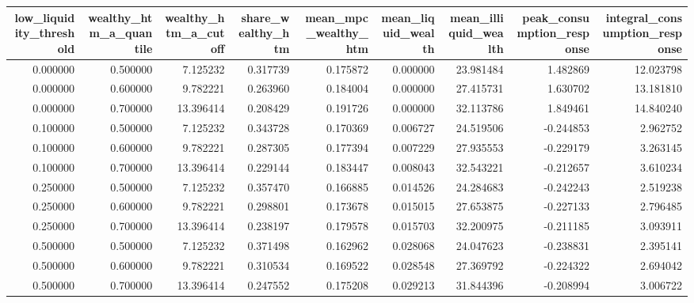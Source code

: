 \begin{tabular}{rrrrrrrrr}
\toprule
low_liquidity_threshold & wealthy_htm_a_quantile & wealthy_htm_a_cutoff & share_wealthy_htm & mean_mpc_wealthy_htm & mean_liquid_wealth & mean_illiquid_wealth & peak_consumption_response & integral_consumption_response \\
\midrule
0.000000 & 0.500000 & 7.125232 & 0.317739 & 0.175872 & 0.000000 & 23.981484 & 1.482869 & 12.023798 \\
0.000000 & 0.600000 & 9.782221 & 0.263960 & 0.184004 & 0.000000 & 27.415731 & 1.630702 & 13.181810 \\
0.000000 & 0.700000 & 13.396414 & 0.208429 & 0.191726 & 0.000000 & 32.113786 & 1.849461 & 14.840240 \\
0.100000 & 0.500000 & 7.125232 & 0.343728 & 0.170369 & 0.006727 & 24.519506 & -0.244853 & 2.962752 \\
0.100000 & 0.600000 & 9.782221 & 0.287305 & 0.177394 & 0.007229 & 27.935553 & -0.229179 & 3.263145 \\
0.100000 & 0.700000 & 13.396414 & 0.229144 & 0.183447 & 0.008043 & 32.543221 & -0.212657 & 3.610234 \\
0.250000 & 0.500000 & 7.125232 & 0.357470 & 0.166885 & 0.014526 & 24.284683 & -0.242243 & 2.519238 \\
0.250000 & 0.600000 & 9.782221 & 0.298801 & 0.173678 & 0.015015 & 27.653875 & -0.227133 & 2.796485 \\
0.250000 & 0.700000 & 13.396414 & 0.238197 & 0.179578 & 0.015703 & 32.200975 & -0.211185 & 3.093911 \\
0.500000 & 0.500000 & 7.125232 & 0.371498 & 0.162962 & 0.028068 & 24.047623 & -0.238831 & 2.395141 \\
0.500000 & 0.600000 & 9.782221 & 0.310534 & 0.169522 & 0.028548 & 27.369792 & -0.224322 & 2.694042 \\
0.500000 & 0.700000 & 13.396414 & 0.247552 & 0.175208 & 0.029213 & 31.844396 & -0.208994 & 3.006722 \\
\bottomrule
\end{tabular}
